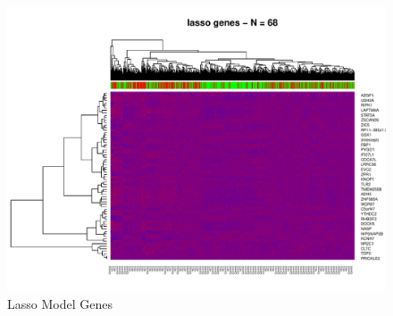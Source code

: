 \documentclass[
]{book}
\begin{document}
\begin{figure}
\centering
\includegraphics{Static/figures/hcc5hmC-glmnetFit-heatmapLasso-1.pdf}
\caption{\label{fig:hcc5hmC-glmnetFit-heatmapLasso}Lasso Model Genes}
\end{figure}
\end{document}
